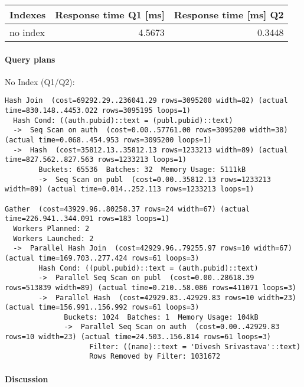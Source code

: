 \documentclass[11pt]{scrartcl}
\begin{document}
\begin{table}[H]
  \centering
  \begin{tabular}{l|r|r}
    Indexes & Response time Q1 [ms] & Response time [ms] Q2 \tabularnewline
    \hline
    no index & 4.5673 & 0.3448 \tabularnewline
  \end{tabular}
\end{table}

\paragraph{Query plans}\mbox{}

No Index (Q1/Q2):

{\small
\parskip0pt\begin{verbatim}
Hash Join  (cost=69292.29..236041.29 rows=3095200 width=82) (actual time=830.148..4453.022 rows=3095195 loops=1)
  Hash Cond: ((auth.pubid)::text = (publ.pubid)::text)
  ->  Seq Scan on auth  (cost=0.00..57761.00 rows=3095200 width=38) (actual time=0.068..454.953 rows=3095200 loops=1)
  ->  Hash  (cost=35812.13..35812.13 rows=1233213 width=89) (actual time=827.562..827.563 rows=1233213 loops=1)
        Buckets: 65536  Batches: 32  Memory Usage: 5111kB
        ->  Seq Scan on publ  (cost=0.00..35812.13 rows=1233213 width=89) (actual time=0.014..252.113 rows=1233213 loops=1)

Gather  (cost=43929.96..80258.37 rows=24 width=67) (actual time=226.941..344.091 rows=183 loops=1)
  Workers Planned: 2
  Workers Launched: 2
  ->  Parallel Hash Join  (cost=42929.96..79255.97 rows=10 width=67) (actual time=169.703..277.424 rows=61 loops=3)
        Hash Cond: ((publ.pubid)::text = (auth.pubid)::text)
        ->  Parallel Seq Scan on publ  (cost=0.00..28618.39 rows=513839 width=89) (actual time=0.210..58.086 rows=411071 loops=3)
        ->  Parallel Hash  (cost=42929.83..42929.83 rows=10 width=23) (actual time=156.991..156.992 rows=61 loops=3)
              Buckets: 1024  Batches: 1  Memory Usage: 104kB
              ->  Parallel Seq Scan on auth  (cost=0.00..42929.83 rows=10 width=23) (actual time=24.503..156.814 rows=61 loops=3)
                    Filter: ((name)::text = 'Divesh Srivastava'::text)
                    Rows Removed by Filter: 1031672
\end{verbatim}}

\paragraph{Discussion}
\end{document}
